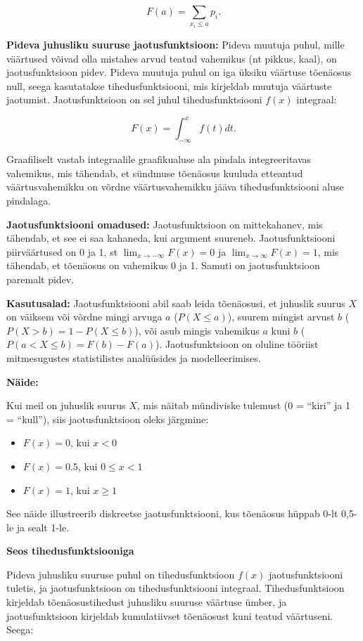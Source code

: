 \documentclass[
]{book}
\providecommand{\tightlist}{%
  \setlength{\itemsep}{0pt}\setlength{\parskip}{0pt}}
\begin{document}
\[F(a) = \sum_{x_i \leq a} p_i.\]

\textbf{Pideva juhusliku suuruse jaotusfunktsioon:} Pideva muutuja puhul, mille väärtused võivad olla mistahes arvud teatud vahemikus (nt pikkus, kaal), on jaotusfunktsioon pidev. Pideva muutuja puhul on iga üksiku väärtuse tõenäosus null, seega kasutatakse tihedusfunktsiooni, mis kirjeldab muutuja väärtuste jaotumist. Jaotusfunktsioon on sel juhul tihedusfunktsiooni \(f(x)\) integraal:

\[F(x) = \int_{-\infty}^{x} f(t) dt.\]

Graafiliselt vastab integraalile graafikualuse ala pindala integreeritavas vahemikus, mis tähendab, et sündmuse tõenäosus kuuluda etteantud väärtusvahemikku on võrdne väärtusvahemikku jääva tihedusfunktsiooni aluse pindalaga.

\textbf{Jaotusfunktsiooni omadused:} Jaotusfunktsioon on mittekahanev, mis tähendab, et see ei saa kahaneda, kui argument suureneb. Jaotusfunktsiooni piirväärtused on 0 ja 1, st \(\lim_{x \to -\infty} F(x) = 0\) ja \(\lim_{x \to \infty} F(x) = 1\), mis tähendab, et tõenäosus on vahemikus 0 ja 1. Samuti on jaotusfunktsioon paremalt pidev.

\textbf{Kasutusalad:} Jaotusfunktsiooni abil saab leida tõenäosusi, et juhuslik suurus \(X\) on väiksem või võrdne mingi arvuga \(a\) (\(P(X \leq a)\)), suurem mingist arvust \(b\) (\(P(X > b) = 1 - P(X \leq b)\)), või asub mingis vahemikus \(a\) kuni \(b\) (\(P(a < X \leq b) = F(b) - F(a)\)). Jaotusfunktsioon on oluline tööriist mitmesugustes statistilistes analüüsides ja modelleerimises.

\textbf{Näide:}

Kui meil on juhuslik suurus \(X\), mis näitab mündiviske tulemust (0 = ``kiri'' ja 1 = ``kull''), siis jaotusfunktsioon oleks järgmine:

\begin{itemize}
\tightlist
\item
  \(F(x) = 0\), kui \(x < 0\)
\item
  \(F(x) = 0.5\), kui \(0 \leq x < 1\)
\item
  \(F(x) = 1\), kui \(x \geq 1\)
\end{itemize}

See näide illustreerib diskreetse jaotusfunktsiooni, kus tõenäosus hüppab 0-lt 0,5-le ja sealt 1-le.

\textbf{Seos tihedusfunktsiooniga}

Pideva juhusliku suuruse puhul on tihedusfunktsioon \(f(x)\) jaotusfunktsiooni tuletis, ja jaotusfunktsioon on tihedusfunktsiooni integraal. Tihedusfunktsioon kirjeldab tõenäosustihedust juhusliku suuruse väärtuse ümber, ja jaotusfunktsioon kirjeldab kumulatiivset tõenäosust kuni teatud väärtuseni. Seega:
\end{document}
